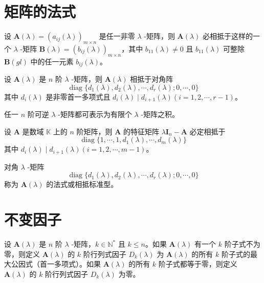 \section{矩阵的法式}

\begin{lemma}
    设 $\bm{A}(\lambda) = (a_{ij}(\lambda))_{m \times n}$ 是任一非零 $\lambda$ -矩阵，则 $\bm{A}(\lambda)$ 必相抵于这样的一个 $\lambda$ -矩阵 $\bm{B}(\lambda) = (b_{ij}(\lambda))_{m \times n}$，其中 $b_{11}(\lambda) \neq 0$ 且 $b_{11}(\lambda)$ 可整除 $\bm{B}(gl)$ 中的任一元素 $b_{ij}(\lambda)$。
\end{lemma}

\begin{theorem}
    设 $\bm{A}(\lambda)$ 是 $n$ 阶 $\lambda$ -矩阵，则 $\bm{A}(\lambda)$ 相抵于对角阵
    \[
        \operatorname{diag}\{ d_{1}(\lambda), d_{2}(\lambda), \cdots, d_{r}(\lambda); 0, \cdots, 0 \}
    \]
    其中 $d_{i}(\lambda)$ 是非零首一多项式且 $d_{i}(\lambda) \mid d_{i + 1}(\lambda)(i = 1, 2, \cdots, r - 1)$。
\end{theorem}

\begin{corollary}
    任一 $n$ 阶可逆 $\lambda$ -矩阵都可表示为有限个 $\lambda$ -矩阵之积。
\end{corollary}

\begin{corollary}
    设 $\bm{A}$ 是数域 $\mathbb{K}$ 上的 $n$ 阶矩阵，则 $\bm{A}$ 的特征矩阵 $\lambda \bm{I}_{n} - \bm{A}$ 必定相抵于
    \[
        \operatorname{diag}\{ 1, \cdots, 1, d_{1}(\lambda), \cdots, d_{m}(\lambda) \}
    \]
    其中 $d_{i}(\lambda) \mid d_{i + 1}(\lambda)(i = 1, 2, \cdots, m - 1)$。
\end{corollary}


\begin{definition}
    对角 $\lambda$ -矩阵
    \[
        \operatorname{diag}\{ d_{1}(\lambda), d_{2}(\lambda), \cdots, d_{r}(\lambda); 0, \cdots, 0 \}
    \]
    称为 $\bm{A}(\lambda)$ 的法式或相抵标准型。
\end{definition}



\section{不变因子}

\begin{definition}
    设 $\bm{A}(\lambda)$ 是 $n$ 阶 $\lambda$ -矩阵，$k \in \mathbb{N}^*$ 且 $k \leqslant n$。如果 $\bm{A}(\lambda)$ 有一个 $k$ 阶子式不为零，则定义 $\bm{A}(\lambda)$ 的 $k$ 阶行列式因子 $D_{k}(\lambda)$ 为 $\bm{A}(\lambda)$ 的所有 $k$ 阶子式的最大公因式（首一多项式）。如果 $\bm{A}(\lambda)$ 的所有 $k$ 阶子式都等于零，则定义 $\bm{A}(\lambda)$ 的 $k$ 阶行列式因子 $D_{k}(\lambda)$ 为零。
\end{definition}

